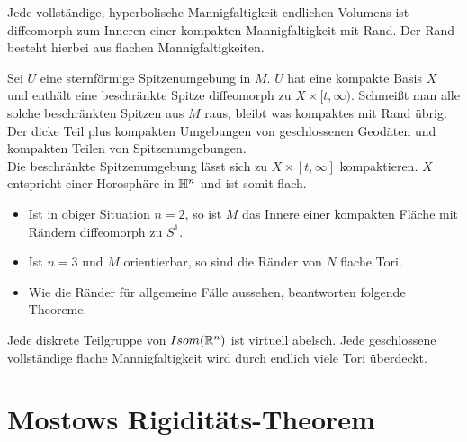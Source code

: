 \documentclass{book}
\begin{document}
\Kor{}
Jede vollständige, hyperbolische Mannigfaltigkeit endlichen Volumens ist diffeomorph zum Inneren einer kompakten Mannigfaltigkeit mit Rand. Der Rand besteht hierbei aus flachen Mannigfaltigkeiten.
\begin{Beweis}{}
	Sei $U$ eine sternförmige Spitzenumgebung in $M$. $U$ hat eine kompakte Basis $X$ und enthält eine beschränkte Spitze diffeomorph zu $X \times [t, \infty)$. Schmeißt man alle solche beschränkten Spitzen aus $M$ raus, bleibt was kompaktes mit Rand übrig: Der dicke Teil plus kompakten Umgebungen von geschlossenen Geodäten und kompakten Teilen von Spitzenumgebungen.\\
	Die beschränkte Spitzenumgebung lässt sich zu $X\times [t,\infty]$ kompaktieren. $X$ entspricht einer Horosphäre in $\mathbb{H}^n$ und ist somit flach.
\end{Beweis}

\Bem{}
\begin{itemize}
	\item Ist in obiger Situation $n = 2$, so ist $M$ das Innere einer kompakten Fläche mit Rändern diffeomorph zu $S^1$.
	\item Ist $n = 3$ und $M$ orientierbar, so sind die Ränder von $N$ flache Tori.
	\item Wie die Ränder für allgemeine Fälle aussehen, beantworten folgende Theoreme.
\end{itemize}

\Satz{}
\label{IsomRn}
Jede diskrete Teilgruppe von $Isom(\mathbb{R}^n)$ ist virtuell abelsch.
Jede geschlossene vollständige flache Mannigfaltigkeit wird durch endlich viele Tori überdeckt.

\chapter{Mostows Rigiditäts-Theorem}
\end{document}
